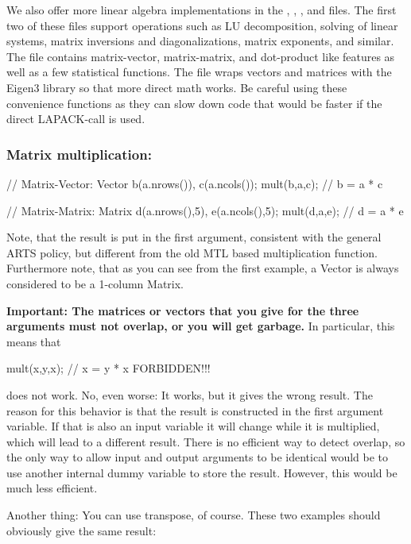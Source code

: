 We also offer more linear algebra implementations in the , , , and  files.  The first two of these files support operations such as LU decomposition, solving of linear systems, matrix inversions and diagonalizations, matrix exponents, and similar.  The  file contains matrix-vector, matrix-matrix, and dot-product like features as well as a few statistical functions.  The  file wraps vectors and matrices with the Eigen3 library so that more direct math works.  Be careful using these convenience functions as they can slow down code that would be faster if the direct LAPACK-call is used.

\subsubsection{Matrix multiplication:}
\begin{code}
// Matrix-Vector:
Vector b(a.nrows()), c(a.ncols());
mult(b,a,c);                           // b = a * c

// Matrix-Matrix:
Matrix d(a.nrows(),5), e(a.ncols(),5);
mult(d,a,e);                           // d = a * e
\end{code}

Note, that the result is put in the first argument, consistent with
the general ARTS policy, but different from the old MTL based
multiplication function. Furthermore note, that as you can see from
the first example, a Vector is always considered to be a 1-column
Matrix.

\textbf{Important: The matrices or vectors that you give for the three
arguments must not overlap, or you will get garbage.} In particular,
this means that
\begin{code}
mult(x,y,x);            // x = y * x FORBIDDEN!!!
\end{code}
does not work. No, even worse: It works, but it gives the wrong
result.  The reason for this behavior is that the result is
constructed in the first argument variable. If that is also an input
variable it will change while it is multiplied, which will lead to a
different result.  There is no efficient way to detect overlap, so the
only way to allow input and output arguments to be identical would be
to use another internal dummy variable to store the result. However,
this would be much less efficient.

Another thing: You can use transpose, of course. These two examples
should obviously give the same result:

